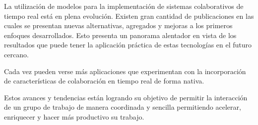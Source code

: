 \documentclass[12pt,a4paper]{article}
\begin{document}
La utilización de modelos para la implementación de sistemas colaborativos de tiempo real está en plena evolución.
Existen gran cantidad de publicaciones en las cuales se presentan nuevas alternativas, agregados y mejoras a los
primeros enfoques desarrollados. Esto presenta un panorama alentador en vista de los resultados que puede tener la aplicación práctica
de estas tecnologías en el futuro cercano.

Cada vez pueden verse más aplicaciones que experimentan con la incorporación de características de colaboración en tiempo real de
forma nativa.

Estos avances y tendencias están logrando su objetivo de permitir la interacción de un grupo de trabajo de manera coordinada y
sencilla permitiendo acelerar, enriquecer y hacer más productivo su trabajo.
\end{document}
